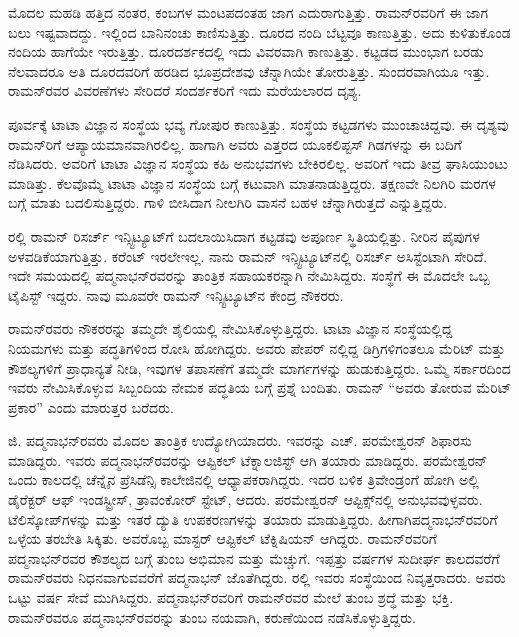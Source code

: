\vskip 2pt

ಮೊದಲ ಮಹಡಿ ಹತ್ತಿದ ನಂತರ, ಕಂಬಗಳ ಮಂಟಪದಂತಹ ಜಾಗ ಎದುರಾಗುತ್ತಿತ್ತು. ರಾಮನ್‍ರವರಿಗೆ ಈ ಜಾಗ ಬಲು ಇಷ್ಟವಾದದ್ದು. ಇಲ್ಲಿಂದ ಬಾನಿನಂಚು ಕಾಣಿಸುತ್ತಿತ್ತು. ದೂರದ ನಂದಿ ಬೆಟ್ಟವೂ ಕಾಣುತ್ತಿತ್ತು. ಅದು ಕುಳಿತುಕೊಂಡ ನಂದಿಯ ಹಾಗೆಯೇ ಇರುತ್ತಿತ್ತು. ದೂರದರ್ಶಕ\-ದಲ್ಲಿ ಇದು ವಿವರವಾಗಿ ಕಾಣುತ್ತಿತ್ತು. ಕಟ್ಟಡದ ಮುಂಭಾಗ ಬರಡು ನೆಲವಾದರೂ ಅತಿ ದೂರದವರಿಗೆ ಹರಡಿದ ಭೂಪ್ರದೇಶವು ಚೆನ್ನಾಗಿಯೇ ತೋರುತ್ತಿತ್ತು. ಸುಂದರವಾಗಿಯೂ ಇತ್ತು. ರಾಮನ್‍ರವರ ವಿವರಣೆಗಳು ಸೇರಿದರೆ ಸಂದರ್ಶಕರಿಗೆ ಇದು ಮರೆಯಲಾರದ ದೃಶ್ಯ.

\vskip 2pt

ಪೂರ್ವಕ್ಕೆ ಟಾಟಾ ವಿಜ್ಞಾನ ಸಂಸ್ಥೆಯ ಭವ್ಯ ಗೋಪುರ ಕಾಣುತ್ತಿತ್ತು. ಸಂಸ್ಥೆಯ ಕಟ್ಟಡಗಳು ಮುಂಚಾಚಿದ್ದವು. ಈ ದೃಶ್ಯವು ರಾಮನ್‍ರಿಗೆ ಆಪ್ಯಾಯಮಾನವಾಗಿರಲಿಲ್ಲ. ಹಾಗಾಗಿ ಅವರು ಎತ್ತರದ ಯೂಕಲಿಪ್ಟಸ್ ಗಿಡಗಳನ್ನು ಈ ಬದಿಗೆ ನೆಡಿಸಿದರು. ಅವರಿಗೆ ಟಾಟಾ ವಿಜ್ಞಾನ ಸಂಸ್ಥೆಯ ಕಹಿ ಅನುಭವಗಳು ಬೇಕಿರಲಿಲ್ಲ. ಅವರಿಗೆ ಇದು ತೀವ್ರ ಘಾಸಿಯುಂಟು ಮಾಡಿತ್ತು. ಕೆಲವೊಮ್ಮೆ ಟಾಟಾ ವಿಜ್ಞಾನ ಸಂಸ್ಥೆಯ ಬಗ್ಗೆ ಕಟುವಾಗಿ ಮಾತನಾಡುತ್ತಿದ್ದರು. ತಕ್ಷಣವೇ ನಿಲಗಿರಿ ಮರಗಳ ಬಗ್ಗೆ ಮಾತು ಬದಲಿಸುತ್ತಿದ್ದರು. ಗಾಳಿ ಬೀಸಿದಾಗ ನೀಲಗಿರಿ ವಾಸನೆ ಬಹಳ ಚೆನ್ನಾಗಿರುತ್ತದೆ ಎನ್ನುತ್ತಿದ್ದರು.

\vskip 2pt

ರಲ್ಲಿ ರಾಮನ್ ರಿಸರ್ಚ್ ಇನ್ಸ್ಟಿಟ್ಯೂಟ್‍ಗೆ ಬದಲಾಯಿಸಿದಾಗ ಕಟ್ಟಡವು ಅಪೂರ್ಣ ಸ್ಥಿತಿಯಲ್ಲಿತ್ತು. ನೀರಿನ ಪೈಪುಗಳ ಅಳವಡಿಕೆಯಾಗುತ್ತಿತ್ತು. ಕರೆಂಟ್ ಇರಲೇಇಲ್ಲ. ನಾನು ರಾಮನ್ ಇನ್ಸ್ಟಿಟ್ಯೂಟ್‍ನಲ್ಲಿ ರಿಸರ್ಚ್ ಅಸಿಸ್ಟೆಂಟಾಗಿ ಸೇರಿದೆ. ಇದೇ ಸಮಯದಲ್ಲಿ ಪದ್ಮನಾಭನ್‍ರವರನ್ನು ತಾಂತ್ರಿಕ ಸಹಾಯಕರನ್ನಾಗಿ ನೇಮಿಸಿದ್ದರು. ಸಂಸ್ಥೆಗೆ ಈ ಮೊದಲೇ ಒಬ್ಬ ಟೈಪಿಸ್ಟ್ ಇದ್ದರು. ನಾವು ಮೂವರೇ ರಾಮನ್ ಇನ್ಸ್ಟಿಟ್ಯೂಟ್‍ನ ಕೇಂದ್ರ ನೌಕರರು.

\vskip 2pt

ರಾಮನ್‍ರವರು ನೌಕರರನ್ನು ತಮ್ಮದೇ ಶೈಲಿಯಲ್ಲಿ ನೇಮಿಸಿಕೊಳ್ಳುತ್ತಿದ್ದರು. ಟಾಟಾ ವಿಜ್ಞಾನ ಸಂಸ್ಥೆಯಲ್ಲಿದ್ದ ನಿಯಮಗಳು ಮತ್ತು ಪದ್ಧತಿಗಳಿಂದ ರೋಸಿ ಹೋಗಿದ್ದರು. ಅವರು ಪೇಪರ್ ನಲ್ಲಿದ್ದ ಡಿಗ್ರಿಗಳಿಗಂತಲೂ ಮೆರಿಟ್ ಮತ್ತು ಕೌಶಲ್ಯಗಳಿಗೆ ಪ್ರಾಧಾನ್ಯತೆ ನೀಡಿ, ಇವುಗಳ ತಪಾಸಣೆಗೆ ತಮ್ಮದೇ ಮಾರ್ಗಗಳನ್ನು ಹುಡುಕುತ್ತಿದ್ದರು. ಒಮ್ಮೆ ಸರ್ಕಾರದಿಂದ ಇವರು ನೇಮಿಸಿಕೊಳ್ಳುವ ಸಿಬ್ಬಂದಿಯ ನೇಮಕ ಪದ್ಧತಿಯ ಬಗ್ಗೆ ಪ್ರಶ್ನೆ ಬಂದಿತು. ರಾಮನ್  “ಅವರು ತೋರುವ ಮೆರಿಟ್ ಪ್ರಕಾರ” ಎಂದು ಮಾರುತ್ತರ ಬರೆದರು.

ಜಿ. ಪದ್ಮನಾಭನ್‍ರವರು ಮೊದಲ ತಾಂತ್ರಿಕ ಉದ್ಯೋಗಿಯಾದರು. ಇವರನ್ನು ಎಚ್. ಪರಮೇಶ್ವರನ್ ಶಿಫಾರಸು ಮಾಡಿದ್ದರು. ಇವರು ಪದ್ಮನಾಭನ್‍ರವರನ್ನು ಆಪ್ಟಿಕಲ್ ಟೆಕ್ನಾಲಜಿಸ್ಟ್ ಆಗಿ ತಯಾರು ಮಾಡಿದ್ದರು. ಪರಮೇಶ್ವರನ್ ಒಂದು ಕಾಲದಲ್ಲಿ ಚೆನ್ನೈನ ಪ್ರೆಸಿಡೆನ್ಸಿ ಕಾಲೇಜಿನಲ್ಲಿ ಆಧ್ಯಾಪಕರಾಗಿದ್ದರು. ಇದರ ಬಳಿಕ ತ್ರಿವೇಂಡ್ರಂಗೆ ಹೋಗಿ ಅಲ್ಲಿ ಡೈರೆಕ್ಟರ್ ಆಫ್ ಇಂಡಸ್ಟ್ರೀಸ್, ತ್ರಾವಂಕೋರ್ ಸ್ಟೇಟ್, ಆದರು. ಪರಮೇಶ್ವರನ್ ಆಪ್ಟಿಕ್ಸ್‌ನಲ್ಲಿ ಅನುಭವವುಳ್ಳವರು. ಟೆಲಿಸ್ಕೋಪ್‍\-ಗಳನ್ನು ಮತ್ತು ಇತರೆ ದ್ಯುತಿ ಉಪಕರಣಗಳನ್ನು ತಯಾರು ಮಾಡುತ್ತಿದ್ದರು. ಹೀಗಾಗಿ\break ಪದ್ಮನಾಭನ್‍ರವರಿಗೆ ಒಳ್ಳೆಯ ತರಬೇತಿ ಸಿಕ್ಕಿತು. ಅವರೊಬ್ಬ ಮಾಸ್ಟರ್ ಆಪ್ಟಿಕಲ್ ಟೆಕ್ನಿಷಿಯನ್ ಆಗಿದ್ದರು. ರಾಮನ್‍ರವರಿಗೆ ಪದ್ಮನಾಭನ್‍ರವರ ಕೌಶಲ್ಯದ ಬಗ್ಗೆ ತುಂಬ ಅಭಿಮಾನ ಮತ್ತು ಮೆಚ್ಚುಗೆ. ಇಪ್ಪತ್ತು ವರ್ಷಗಳ ಸುದೀರ್ಘ ಕಾಲದವರೆಗೆ ರಾಮನ್‍ರವರು ನಿಧನವಾಗುವವರೆಗೆ ಪದ್ಮನಾಭನ್ ಜೊತೆಗಿದ್ದರು.  ರಲ್ಲಿ ಇವರು ಸಂಸ್ಥೆಯಿಂದ ನಿವೃತ್ತರಾದರು. ಅವರು ಒಟ್ಟು  ವರ್ಷ ಸೇವೆ ಮುಗಿಸಿದ್ದರು. ಪದ್ಮನಾಭನ್‍ರವರಿಗೆ ರಾಮನ್‍ರವರ ಮೇಲೆ ತುಂಬ ಶ್ರದ್ಧೆ ಮತ್ತು ಭಕ್ತಿ. ರಾಮನ್‍ರವರೂ ಪದ್ಮನಾಭನ್‍ರವರನ್ನು ತುಂಬ ನಯವಾಗಿ, ಕರುಣೆಯಿಂದ ನಡೆಸಿಕೊಳ್ಳುತ್ತಿದ್ದರು.

